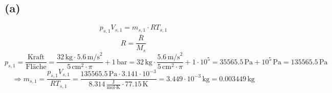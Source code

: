 

\subsection*{(a)}

\[
p_{s,1} V_{s,1} = m_{s,1} \cdot R T_{s,1}
\]
\[
R = \frac{\overline{R}}{M_s}
\]
\[
p_{s,1} = \frac{\text{Kraft}}{\text{Fläche}} = \frac{32 \, \text{kg} \cdot 5.6 \, \text{m/s}^2}{5 \, \text{cm}^2 \cdot \pi} + 1 \, \text{bar} = 32 \, \text{kg} \cdot \frac{5.6 \, \text{m/s}^2}{5 \, \text{cm}^2 \cdot \pi} + 1 \cdot 10^5 = 35565.5 \, \text{Pa} + 10^5 \, \text{Pa} = 135565.5 \, \text{Pa}
\]
\[
\Rightarrow m_{s,1} = \frac{p_{s,1} V_{s,1}}{R T_{s,1}} = \frac{135565.5 \, \text{Pa} \cdot 3.141 \cdot 10^{-3}}{8.314 \, \frac{\text{J}}{\text{mol} \cdot \text{K}} \cdot 77.15 \, \text{K}} = 3.449 \cdot 10^{-3} \, \text{kg} = 0.003449 \, \text{kg}
\]